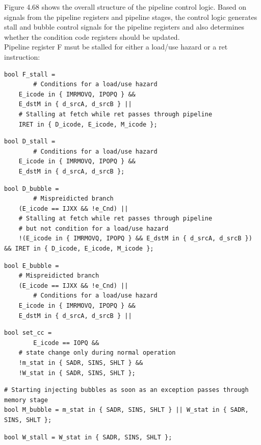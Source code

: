 \documentclass[11pt]{article}
\begin{document}
\begin{enumerate}
Figure 4.68 shows the overall structure of the pipeline control logic. Based on signals from the pipeline registers and pipeline stages, the control logic generates stall and bubble control signals for the pipeline registers and also determines whether the condition code registers should be updated.\\

Pipeline register F msut be stalled for either a load/use hazard or a ret instruction:\\
\begin{verbatim}
bool F_stall = 
        # Conditions for a load/use hazard
	E_icode in { IMRMOVQ, IPOPQ } &&
	E_dstM in { d_srcA, d_srcB } ||
	# Stalling at fetch while ret passes through pipeline
	IRET in { D_icode, E_icode, M_icode };
\end{verbatim}

\begin{verbatim}
bool D_stall =
        # Conditions for a load/use hazard
	E_icode in { IMRMOVQ, IPOPQ } &&
	E_dstM in { d_srcA, d_srcB };
\end{verbatim}


\begin{verbatim}
bool D_bubble =
        # Mispreidicted branch
	(E_icode == IJXX && !e_Cnd) ||
	# Stalling at fetch while ret passes through pipeline
	# but not condition for a load/use hazard
	!(E_icode in { IMRMOVQ, IPOPQ } && E_dstM in { d_srcA, d_srcB }) && IRET in { D_icode, E_icode, M_icode };
\end{verbatim}

\begin{verbatim}
bool E_bubble =
	# Mispreidicted branch
	(E_icode == IJXX && !e_Cnd) ||
        # Conditions for a load/use hazard
	E_icode in { IMRMOVQ, IPOPQ } &&
	E_dstM in { d_srcA, d_srcB } ||
\end{verbatim}

\begin{verbatim}
bool set_cc = 
        E_icode == IOPQ &&
	# state change only during normal operation
	!m_stat in { SADR, SINS, SHLT } &&
	!W_stat in { SADR, SINS, SHLT };
\end{verbatim}

\begin{verbatim}
# Starting injecting bubbles as soon as an exception passes through memory stage
bool M_bubble = m_stat in { SADR, SINS, SHLT } || W_stat in { SADR, SINS, SHLT };
\end{verbatim}

\begin{verbatim}
bool W_stall = W_stat in { SADR, SINS, SHLT };
\end{verbatim}
\end{enumerate}
\end{document}
